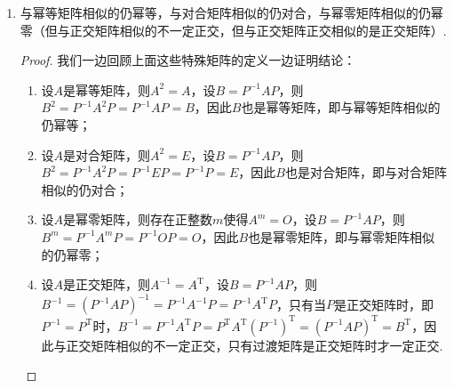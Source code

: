 \begin{enumerate}
          \begin{proof}
              设$B=P^{-1}AP$，则$|\lambda E-B|=|\lambda E-P^{-1}AP|=|P^{-1}(\lambda E-A)P|=|P^{-1}||\lambda E-A||P|=|\lambda E-A|$. 因此$A\sim B$有$|\lambda E-A|=|\lambda E-B|$.

              我们知道特征多项式相同则特征值相同，迹等于所有特征值之和，行列式等于所有特征值之积，因此相似矩阵有相同的迹，行列式，特征值.

              相似矩阵来源于同一线性变换在不同基下的表示，因此它们的特征向量是线性变换的特征向量在不同基下的坐标，因此不一定相同.
          \end{proof}

    \item 与幂等矩阵相似的仍幂等，与对合矩阵相似的仍对合，与幂零矩阵相似的仍幂零（但与正交矩阵相似的不一定正交，但与正交矩阵正交相似的是正交矩阵）.

          \begin{proof}
              我们一边回顾上面这些特殊矩阵的定义一边证明结论：
              \begin{enumerate}
                  \item 设$A$是幂等矩阵，则$A^2=A$，设$B=P^{-1}AP$，则$B^2=P^{-1}A^2P=P^{-1}AP=B$，因此$B$也是幂等矩阵，即与幂等矩阵相似的仍幂等；

                  \item 设$A$是对合矩阵，则$A^2=E$，设$B=P^{-1}AP$，则$B^2=P^{-1}A^2P=P^{-1}EP=P^{-1}P=E$，因此$B$也是对合矩阵，即与对合矩阵相似的仍对合；

                  \item 设$A$是幂零矩阵，则存在正整数$m$使得$A^m=O$，设$B=P^{-1}AP$，则$B^m=P^{-1}A^mP=P^{-1}OP=O$，因此$B$也是幂零矩阵，即与幂零矩阵相似的仍幂零；

                  \item 设$A$是正交矩阵，则$A^{-1}=A^\mathrm{T}$，设$B=P^{-1}AP$，则$B^{-1}=(P^{-1}AP)^{-1}=P^{-1}A^{-1}P=P^{-1}A^\mathrm{T}P$，只有当$P$是正交矩阵时，即$P^{-1}=P^\mathrm{T}$时，$B^{-1}=P^{-1}A^\mathrm{T}P=P^\mathrm{T}A^\mathrm{T}(P^{-1})^\mathrm{T}=(P^{-1}AP)^\mathrm{T}=B^\mathrm{T}$，因此与正交矩阵相似的不一定正交，只有过渡矩阵是正交矩阵时才一定正交.
              \end{enumerate}
          \end{proof}
\end{enumerate}

